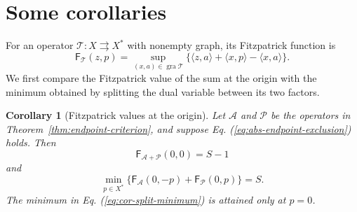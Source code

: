 \documentclass[11pt]{article}
\newcommand{\gra}{\operatorname{gra}}
\newcommand{\pair}[2]{\langle #1,#2\rangle}
\newtheorem{corollary}{Corollary}
\theoremstyle{definition}
\theoremstyle{remark}
\begin{document}
\section{Some corollaries}
\label{sec:corollaries}

For an operator $\mathcal T:X\rightrightarrows X^*$ with nonempty graph, its Fitzpatrick function is
\begin{equation}
\mathsf F_{\mathcal T}(z,p)
=\sup_{(x,a)\in\gra\mathcal T}
\{\pair{z}{a}+\pair{x}{p}-\pair{x}{a}\}.
\label{eq:cor-fitzpatrick}
\end{equation}
We first compare the Fitzpatrick value of the sum at the origin with the minimum obtained by splitting the dual variable between its two factors.

\begin{corollary}[Fitzpatrick values at the origin]
\label{cor:fitzpatrick-values}
Let $\mathcal A$ and $\mathcal P$ be the operators in Theorem~\ref{thm:endpoint-criterion}, and suppose Eq. (\ref{eq:abs-endpoint-exclusion}) holds. Then
\begin{equation}
\mathsf F_{\mathcal A+\mathcal P}(0,0)=S-1
\label{eq:cor-sum-fitzpatrick}
\end{equation}
and
\begin{equation}
\min_{p\in X^*}
\{\mathsf F_{\mathcal A}(0,-p)+\mathsf F_{\mathcal P}(0,p)\}=S.
\label{eq:cor-split-minimum}
\end{equation}
The minimum in Eq. (\ref{eq:cor-split-minimum}) is attained only at $p=0$.
\end{corollary}
\end{document}
